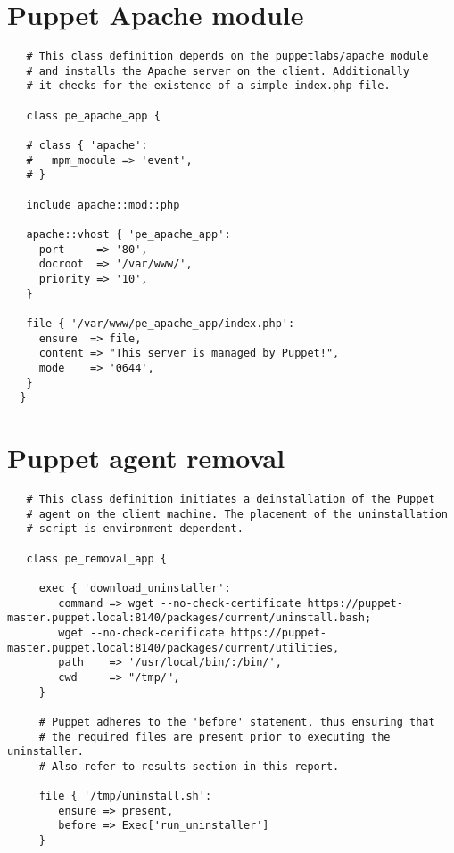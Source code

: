 \begin{appendices}
  \renewcommand\thetable{\thesection\arabic{table}}
  \renewcommand\thefigure{\thesection\arabic{figure}}

  \section{Puppet Apache module} \label{app:puppetmodule}
  \begin{lstlisting}
   # This class definition depends on the puppetlabs/apache module
   # and installs the Apache server on the client. Additionally
   # it checks for the existence of a simple index.php file. 

   class pe_apache_app {

   # class { 'apache':
   #   mpm_module => 'event',
   # }

   include apache::mod::php

   apache::vhost { 'pe_apache_app':
     port     => '80',
     docroot  => '/var/www/',
     priority => '10',
   }

   file { '/var/www/pe_apache_app/index.php':
     ensure  => file,
     content => "This server is managed by Puppet!",
     mode    => '0644',
   }
  }
  \end{lstlisting}

  \newpage
  \section{Puppet agent removal} \label{app:puppetagent}
  \begin{lstlisting}
   # This class definition initiates a deinstallation of the Puppet
   # agent on the client machine. The placement of the uninstallation
   # script is environment dependent.
       
   class pe_removal_app {

     exec { 'download_uninstaller':
        command => wget --no-check-certificate https://puppet-master.puppet.local:8140/packages/current/uninstall.bash;
        wget --no-check-cerificate https://puppet-master.puppet.local:8140/packages/current/utilities,
        path    => '/usr/local/bin/:/bin/',
        cwd     => "/tmp/",
     }     

     # Puppet adheres to the 'before' statement, thus ensuring that  
     # the required files are present prior to executing the uninstaller. 
     # Also refer to results section in this report.
 
     file { '/tmp/uninstall.sh': 
        ensure => present,
        before => Exec['run_uninstaller'] 
     }


\end{lstlisting}
\end{appendices}
